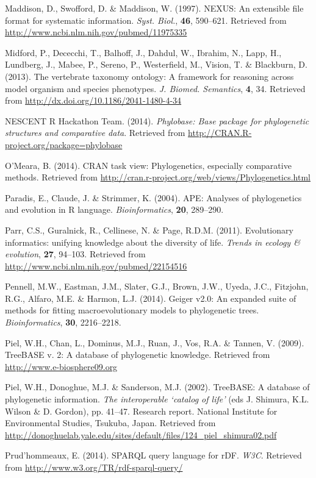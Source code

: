 \documentclass[author-year, review, 11pt]{elsarticle} %
\begin{document}
Maddison, D., Swofford, D. \& Maddison, W. (1997). NEXUS: An extensible
file format for systematic information. \emph{Syst. Biol.}, \textbf{46},
590--621. Retrieved from
\url{http://www.ncbi.nlm.nih.gov/pubmed/11975335}

Midford, P., Dececchi, T., Balhoff, J., Dahdul, W., Ibrahim, N., Lapp,
H., Lundberg, J., Mabee, P., Sereno, P., Westerfield, M., Vision, T. \&
Blackburn, D. (2013). The vertebrate taxonomy ontology: A framework for
reasoning across model organism and species phenotypes. \emph{J. Biomed.
Semantics}, \textbf{4}, 34. Retrieved from
\url{http://dx.doi.org/10.1186/2041-1480-4-34}

NESCENT R Hackathon Team. (2014). \emph{Phylobase: Base package for
phylogenetic structures and comparative data}. Retrieved from
\url{http://CRAN.R-project.org/package=phylobase}

O'Meara, B. (2014). CRAN task view: Phylogenetics, especially
comparative methods. Retrieved from
\url{http://cran.r-project.org/web/views/Phylogenetics.html}

Paradis, E., Claude, J. \& Strimmer, K. (2004). APE: Analyses of
phylogenetics and evolution in R language. \emph{Bioinformatics},
\textbf{20}, 289--290.

Parr, C.S., Guralnick, R., Cellinese, N. \& Page, R.D.M. (2011).
Evolutionary informatics: unifying knowledge about the diversity of
life. \emph{Trends in ecology \& evolution}, \textbf{27}, 94--103.
Retrieved from \url{http://www.ncbi.nlm.nih.gov/pubmed/22154516}

Pennell, M.W., Eastman, J.M., Slater, G.J., Brown, J.W., Uyeda, J.C.,
Fitzjohn, R.G., Alfaro, M.E. \& Harmon, L.J. (2014). Geiger v2.0: An
expanded suite of methods for fitting macroevolutionary models to
phylogenetic trees. \emph{Bioinformatics}, \textbf{30}, 2216--2218.

Piel, W.H., Chan, L., Dominus, M.J., Ruan, J., Vos, R.A. \& Tannen, V.
(2009). TreeBASE v. 2: A database of phylogenetic knowledge. Retrieved
from \url{http://www.e-biosphere09.org}

Piel, W.H., Donoghue, M.J. \& Sanderson, M.J. (2002). TreeBASE: A
database of phylogenetic information. \emph{The interoperable `catalog
of life'} (eds J. Shimura, K.L. Wilson \& D. Gordon), pp. 41--47.
Research report. National Institute for Environmental Studies, Tsukuba,
Japan. Retrieved from
\url{http://donoghuelab.yale.edu/sites/default/files/124_piel_shimura02.pdf}

Prud'hommeaux, E. (2014). SPARQL query language for rDF. \emph{W3C}.
Retrieved from \url{http://www.w3.org/TR/rdf-sparql-query/}
\end{document}
